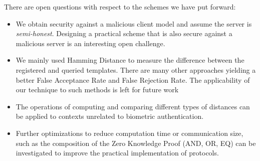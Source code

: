 There are open questions with respect to the schemes we have put forward:
\begin{itemize}
\item We obtain security against a malicious client model and assume the server is
  \textit{semi-honest}. Designing a practical scheme that is also secure against a
  malicious server is an interesting open challenge.
\item We mainly used Hamming Distance to measure the difference between the
  registered and queried templates. There are many other approaches
  \cite{jain201650} yielding a better False Acceptance Rate and False
  Rejection Rate. The applicability of our technique to such methods is left for
  future work
\item The operations of computing and comparing different types of distances can be
applied to contexts unrelated to biometric authentication. 
\item Further optimizations to reduce computation time or communication size, such as the composition of the Zero Knowledge Proof (AND, OR, EQ) can be investigated to improve the practical implementation of protocols.
\end{itemize}

